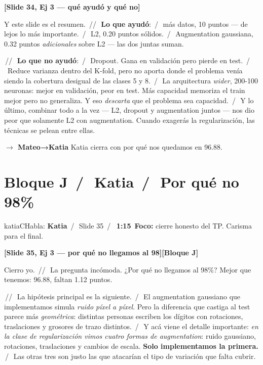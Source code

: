 \documentclass[11pt,a4paper]{article}
\newcommand{\slidenum}[1]{\textcolor{accent}{\textbf{[Slide #1]}}}
\newcommand{\timing}[1]{\textcolor{muted}{\textbf{\,#1\,}}}
\newcommand{\bloque}[1]{\textcolor{muted}{\small\textbf{[Bloque #1]}}}
\newcommand{\enunciado}[1]{\textcolor{warn}{\textit{#1}}}
\newcommand{\pausa}{\textcolor{muted}{\,/\,}}
\newcommand{\Pausa}{\textcolor{muted}{\,/\!/\,}}
\newcommand{\paso}[1]{\textcolor{accent}{\textbf{$\to$ #1}}}
\begin{document}
\slidenum{34, Ej 3 — qué ayudó y qué no}

Y este slide es el resumen. \Pausa\ \textbf{Lo que ayudó}: \pausa\ más datos, 10 puntos --- de lejos lo más importante. \pausa\ L2, 0.20 puntos sólidos. \pausa\ Augmentation gaussiana, 0.32 puntos \emph{adicionales} sobre L2 --- las dos juntas suman.

\Pausa\ \textbf{Lo que no ayudó}: \pausa\ Dropout. Gana en validación pero pierde en test. \pausa\ Reduce varianza dentro del K-fold, pero no aporta donde el problema venía siendo la cobertura desigual de las clases 5 y 8. \pausa\ La arquitectura \emph{wider}, 200-100 neuronas: mejor en validación, peor en test. Más capacidad memoriza el train mejor pero no generaliza. Y eso \emph{descarta} que el problema sea capacidad. \pausa\ Y lo último, combinar todo a la vez --- L2, dropout y augmentation juntos --- nos dio peor que solamente L2 con augmentation. Cuando exagerás la regularización, las técnicas se pelean entre ellas.

\paso{Mateo→Katia} \quad Katia cierra con por qué nos quedamos en 96.88.

\section{Bloque J \pausa\ \textcolor{katiaC}{Katia} \pausa\ Por qué no 98\%}\label{sec:bloqueJ}

\begin{personabox}{katiaC}{Habla: \textcolor{katiaC}{\textbf{Katia}} \pausa\ Slide 35 \pausa\ \timing{1:15}}
\textbf{Foco:} cierre honesto del TP. Carisma para el final.
\end{personabox}

\slidenum{35, Ej 3 — por qué no llegamos al 98}\quad \bloque{J}

Cierro yo. \Pausa\ La pregunta incómoda. ¿Por qué no llegamos al 98\%? Mejor que tenemos: 96.88, faltan 1.12 puntos.

\Pausa\ La hipótesis principal es la siguiente. \pausa\ El augmentation gaussiano que implementamos simula \emph{ruido píxel a píxel}. Pero la diferencia que castiga al test parece más \emph{geométrica}: distintas personas escriben los dígitos con rotaciones, traslaciones y grosores de trazo distintos. \pausa\ Y acá viene el detalle importante: \enunciado{en la clase de regularización vimos cuatro formas de augmentation}: ruido gaussiano, rotaciones, traslaciones y cambios de escala. \textbf{Solo implementamos la primera.} \pausa\ Las otras tres son justo las que atacarían el tipo de variación que falta cubrir.
\end{document}
